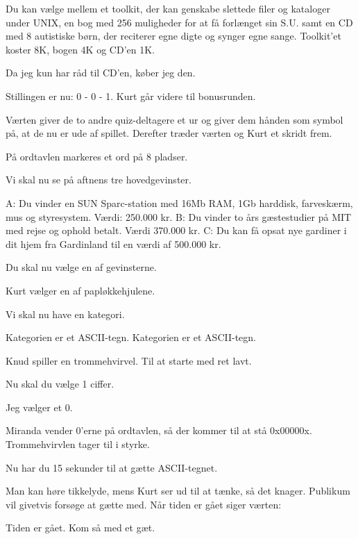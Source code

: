 \documentclass[a4paper,11pt]{article}
\begin{document}
\begin{sketch}
      Du kan vælge mellem et toolkit, der kan genskabe
             slettede filer og kataloger under UNIX, en bog med
             256 muligheder for at få forlænget sin S.U. samt
             en CD med 8 autistiske børn, der reciterer egne
             digte og synger egne sange. Toolkit'et koster 8K, 
             bogen 4K og CD'en 1K.

        Da jeg kun har råd til CD'en, køber jeg den.

      Stillingen er nu: 0 - 0 - 1. Kurt går videre til
             bonusrunden.

\scene Værten giver de to andre quiz-deltagere et ur og giver dem hånden
som symbol på, at de nu er ude af spillet. Derefter træder værten
og Kurt et skridt frem.

\scene På ordtavlen markeres et ord på 8 pladser.

      Vi skal nu se på aftnens tre hovedgevinster.

             A: Du vinder en SUN Sparc-station med 16Mb RAM,
                1Gb harddisk, farveskærm, mus og styresystem.
                Værdi: 250.000 kr.
             B: Du vinder to års gæstestudier på MIT med rejse
                og ophold betalt. Værdi 370.000 kr.
             C: Du kan få opsat nye gardiner i dit hjem fra
                Gardinland til en værdi af 500.000 kr.

             Du skal nu vælge en af gevinsterne.

\scene Kurt vælger en af papløkkehjulene.

      Vi skal nu have en kategori.

      Kategorien er et ASCII-tegn. Kategorien er et
             ASCII-tegn.

\scene Knud spiller en trommehvirvel. Til at starte med ret lavt.

      Nu skal du vælge 1 ciffer.

        Jeg vælger et 0.

\scene Miranda vender 0'erne på ordtavlen, så der kommer til at stå
0x00000x. Trommehvirvlen tager til i styrke.

      Nu har du 15 sekunder til at gætte ASCII-tegnet.

\scene Man kan høre tikkelyde, mens Kurt ser ud til at tænke, så det knager.
Publikum vil givetvis forsøge at gætte med. Når tiden er gået
siger værten:

      Tiden er gået. Kom så med et gæt.


\end{sketch}
\end{document}
